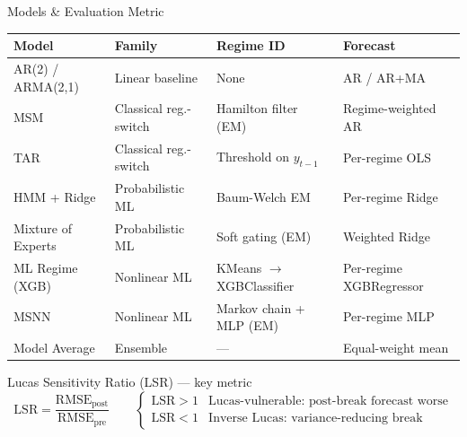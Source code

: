 \documentclass[aspectratio=169, 10pt]{beamer}
\newcommand{\LSR}{\mathrm{LSR}}
\newcommand{\RMSE}{\mathrm{RMSE}}
\begin{document}
\begin{frame}{Models \& Evaluation Metric}

  \begin{center}\small
  \begin{tabular}{llll}
    \toprule
    Model & Family & Regime ID & Forecast \\
    \midrule
    AR(2) / ARMA(2,1) & Linear baseline & None & AR / AR+MA \\
    \rowcolor{lightgrey}
    MSM & Classical reg.-switch & Hamilton filter (EM) & Regime-weighted AR \\
    \rowcolor{lightgrey}
    TAR & Classical reg.-switch & Threshold on $y_{t-1}$ & Per-regime OLS \\
    \rowcolor{cambblue!60}
    HMM + Ridge & Probabilistic ML & Baum-Welch EM & Per-regime Ridge \\
    \rowcolor{cambblue!60}
    Mixture of Experts & Probabilistic ML & Soft gating (EM) & Weighted Ridge \\
    \rowcolor{cambblue!60}
    ML Regime (XGB) & Nonlinear ML & KMeans $\to$ XGBClassifier & Per-regime XGBRegressor \\
    \rowcolor{cambblue!60}
    MSNN & Nonlinear ML & Markov chain + MLP (EM) & Per-regime MLP \\
    \midrule
    Model Average & Ensemble & — & Equal-weight mean \\
    \bottomrule
  \end{tabular}
  \end{center}

  \vspace{4pt}
  \begin{block}{Lucas Sensitivity Ratio (LSR) — key metric}
    \[
      \LSR = \frac{\RMSE_{\text{post}}}{\RMSE_{\text{pre}}}
      \qquad
      \begin{cases}
        \LSR > 1 & \text{Lucas-vulnerable: post-break forecast worse} \\
        \LSR < 1 & \text{Inverse Lucas: variance-reducing break}
      \end{cases}
    \]
  \end{block}

\end{frame}
\end{document}

